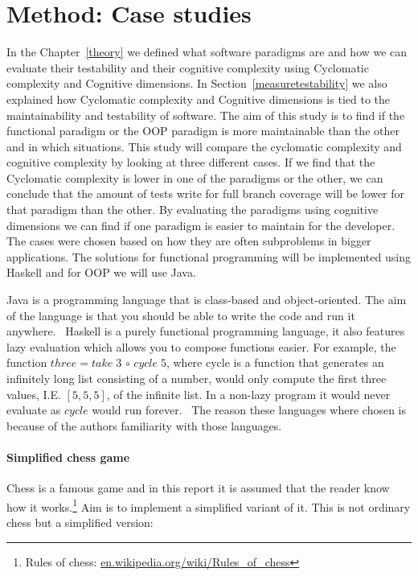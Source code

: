 \documentclass[12pt]{report}
\theoremstyle{definition}
\theoremstyle{theorem}
\begin{document}
\chapter{Method: Case studies}

In the Chapter~\ref{theory} we defined what software paradigms are and how we
can evaluate their testability and their cognitive complexity using Cyclomatic
complexity and Cognitive dimensions. In Section~\ref{measuretestability} we also
explained how Cyclomatic complexity and Cognitive dimensions is tied to the
maintainability and testability of software. The aim of this study is to find if
the functional paradigm or the OOP paradigm is more maintainable than the other
and in which situations. This study will compare the cyclomatic complexity and
cognitive complexity by looking at three different cases. If we find that the
Cyclomatic complexity is lower in one of the paradigms or the other, we can
conclude that the amount of tests write for full branch coverage will be lower
for that paradigm than the other. By evaluating the paradigms using cognitive
dimensions we can find if one paradigm is easier to maintain for the developer.
The cases were chosen based on how they are often subproblems in bigger
applications. The solutions for functional programming will be implemented using
Haskell and for OOP we will use Java. 

Java is a programming language that is class-based and object-oriented. The aim
of the language is that you should be able to write the code and run it
anywhere.~\cite{java} Haskell is a purely functional programming language, it
also features lazy evaluation which allows you to compose functions easier. For
example, the function $three = take\; 3 \, \circ \, cycle\; 5$, where cycle is a
function that generates an infinitely long list consisting of a number, would
only compute the first three values, I.E. $[5,5,5]$, of the infinite list.  In a
non-lazy program it would never evaluate as $cycle$ would run
forever.~\cite{haskell} The reason these languages where chosen is because of
the authors familiarity with those languages.

\subsubsection*{Simplified chess game}

Chess is a famous game and in this report it is assumed that the reader know how
it works.\footnote{Rules of chess: \url{en.wikipedia.org/wiki/Rules_of_chess}}
Aim is to implement a simplified variant of it. This is not ordinary chess but a
simplified version:
\end{document}
